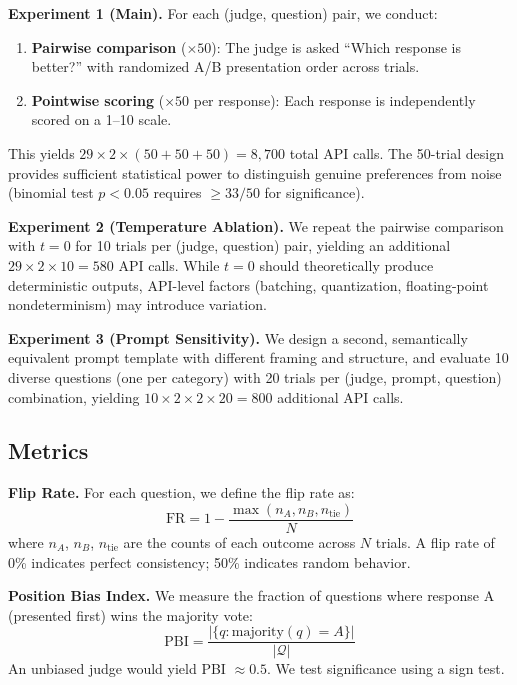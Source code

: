 \documentclass{ijclclp}
\begin{document}
\textbf{Experiment 1 (Main).} For each (judge, question) pair, we conduct:

\begin{enumerate}[nosep]
    \item \textbf{Pairwise comparison} ($\times 50$): The judge is asked ``Which response is better?'' with randomized A/B presentation order across trials.
    \item \textbf{Pointwise scoring} ($\times 50$ per response): Each response is independently scored on a 1--10 scale.
\end{enumerate}

This yields $29 \times 2 \times (50 + 50 + 50) = 8{,}700$ total API calls. The 50-trial design provides sufficient statistical power to distinguish genuine preferences from noise (binomial test $p < 0.05$ requires $\geq 33/50$ for significance).

\textbf{Experiment 2 (Temperature Ablation).} We repeat the pairwise comparison with $t=0$ for 10 trials per (judge, question) pair, yielding an additional $29 \times 2 \times 10 = 580$ API calls. While $t=0$ should theoretically produce deterministic outputs, API-level factors (batching, quantization, floating-point nondeterminism) may introduce variation.

\textbf{Experiment 3 (Prompt Sensitivity).} We design a second, semantically equivalent prompt template with different framing and structure, and evaluate 10 diverse questions (one per category) with 20 trials per (judge, prompt, question) combination, yielding $10 \times 2 \times 2 \times 20 = 800$ additional API calls.

\subsection{Metrics}

\textbf{Flip Rate.} For each question, we define the flip rate as:
\begin{equation}
    \text{FR} = 1 - \frac{\max(n_A, n_B, n_{\text{tie}})}{N}
\end{equation}
where $n_A$, $n_B$, $n_{\text{tie}}$ are the counts of each outcome across $N$ trials. A flip rate of 0\% indicates perfect consistency; 50\% indicates random behavior.

\textbf{Position Bias Index.} We measure the fraction of questions where response A (presented first) wins the majority vote:
\begin{equation}
    \text{PBI} = \frac{|\{q : \text{majority}(q) = A\}|}{|\mathcal{Q}|}
\end{equation}
An unbiased judge would yield PBI $\approx 0.5$. We test significance using a sign test.
\end{document}
